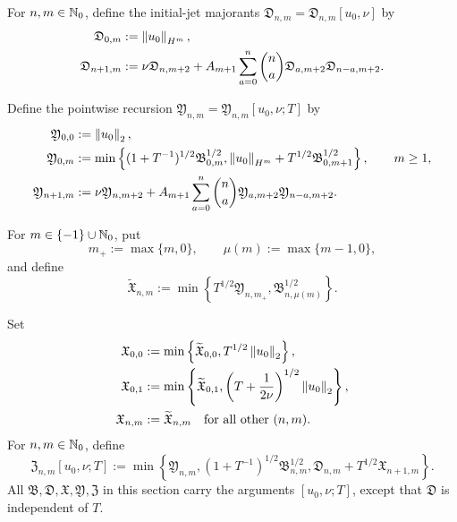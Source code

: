\begin{definition}
For \(n,m\in\mathbb N_0\), define the initial-jet majorants
\(\mathfrak D_{n,m}=\mathfrak D_{n,m}[u_0,\nu]\) by
\begin{align}
 \mathfrak D_{0,m}&:=\left\lVert u_0\right\rVert_{H^m},
 \label{u:eq:qc-D0}\\
 \mathfrak D_{n+1,m}
 &:=\nu\mathfrak D_{n,m+2}
 +A_{m+1}\sum_{a=0}^{n}\binom na
   \mathfrak D_{a,m+2}\mathfrak D_{n-a,m+2}.
 \label{u:eq:qc-Drec}
\end{align}
\begin{samepage}
Define the pointwise recursion
\(\mathfrak Y_{n,m}=\mathfrak Y_{n,m}[u_0,\nu;T]\) by
\begin{align}
 \mathfrak Y_{0,0}&:=\left\lVert u_0\right\rVert_2,
 \label{u:eq:qc-Y00}\\
 \mathfrak Y_{0,m}
 &:=\min\left\{
 (1+T^{-1})^{1/2}\mathfrak B_{0,m}^{1/2},
 \left\lVert u_0\right\rVert_{H^m}+T^{1/2}\mathfrak B_{0,m+1}^{1/2}
 \right\},
 \qquad m\ge1,
 \label{u:eq:qc-Y0}\\
 \mathfrak Y_{n+1,m}
 &:=\nu\mathfrak Y_{n,m+2}
 +A_{m+1}\sum_{a=0}^{n}\binom na
 \mathfrak Y_{a,m+2}\mathfrak Y_{n-a,m+2}.
 \label{u:eq:qc-Yrec}
\end{align}
\end{samepage}
\begin{samepage}
For \(m\in\{-1\}\cup\mathbb N_0\), put
\[
 m_+:=\max\{m,0\},
 \qquad
 \mu(m):=\max\{m-1,0\},
\]
and define
\begin{equation}
 \widetilde{\mathfrak X}_{n,m}
 :=\min\left\{
 T^{1/2}\mathfrak Y_{n,m_+},
 \mathfrak B_{n,\mu(m)}^{1/2}
 \right\}.
 \label{u:eq:qc-Xraw}
\end{equation}
\end{samepage}
Set
\begin{align}
 \mathfrak X_{0,0}
 &:=\min\left\{\widetilde{\mathfrak X}_{0,0},
 T^{1/2}\left\lVert u_0\right\rVert_2\right\},
 \label{u:eq:qc-X00}\\
 \mathfrak X_{0,1}
 &:=\min\left\{\widetilde{\mathfrak X}_{0,1},
 \left(T+\frac1{2\nu}\right)^{1/2}\left\lVert u_0\right\rVert_2\right\},
 \label{u:eq:qc-X01}\\
 \mathfrak X_{n,m}&:=\widetilde{\mathfrak X}_{n,m}
 \quad\text{for all other }(n,m).
 \label{u:eq:qc-Xotherwise}
\end{align}
For \(n,m\in\mathbb N_0\), define
\begin{equation}
 \mathfrak Z_{n,m}[u_0,\nu;T]
 :=\min\left\{
 \mathfrak Y_{n,m},
 (1+T^{-1})^{1/2}\mathfrak B_{n,m}^{1/2},
 \mathfrak D_{n,m}+T^{1/2}\mathfrak X_{n+1,m}
 \right\}.
 \label{u:eq:qc-Z}
\end{equation}
All \(\mathfrak B,\mathfrak D,\mathfrak X,\mathfrak Y,\mathfrak Z\) in
this section carry the arguments \([u_0,\nu;T]\), except that
\(\mathfrak D\) is independent of \(T\).
\end{definition}

